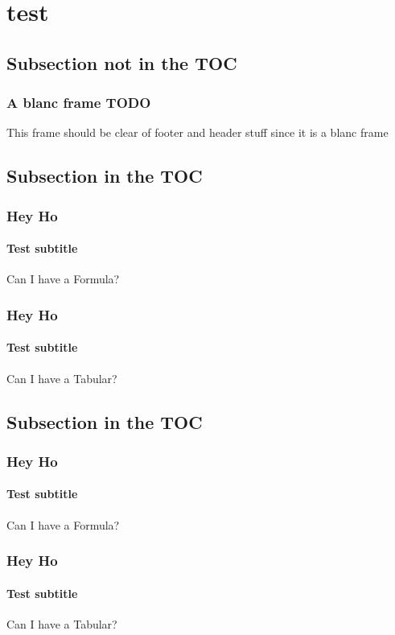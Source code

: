 \documentclass[german,aspectratio=169,notoc,titlestyle=white,structurestyle=white]{tudbeamer}%
\begin{document}
\section{test}
\subsection*{Subsection not in the TOC}
\begin{frame}[allowframebreaks]
	\frametitle{A blanc frame TODO}
	This frame should be clear of footer and header stuff since it is a blanc frame
\end{frame}

\subsection{Subsection in the TOC}
\begin{frame}
	\frametitle{Hey Ho}
	\framesubtitle{Test subtitle}
	Can I have a Formula?
\end{frame}
\begin{frame}
	\frametitle{Hey Ho}
	\framesubtitle{Test subtitle}
	Can I have a Tabular?
\end{frame}

\subsection{Subsection in the TOC}
\begin{frame}
	\frametitle{Hey Ho}
	\framesubtitle{Test subtitle}
	Can I have a Formula?
\end{frame}
\begin{frame}
	\frametitle{Hey Ho}
	\framesubtitle{Test subtitle}
	Can I have a Tabular?
\end{frame}
\end{document}
